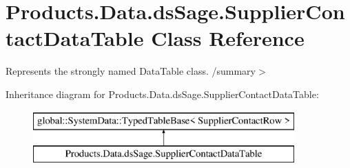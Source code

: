 \hypertarget{class_products_1_1_data_1_1ds_sage_1_1_supplier_contact_data_table}{}\section{Products.\+Data.\+ds\+Sage.\+Supplier\+Contact\+Data\+Table Class Reference}
\label{class_products_1_1_data_1_1ds_sage_1_1_supplier_contact_data_table}


Represents the strongly named Data\+Table class. /summary$>$  


Inheritance diagram for Products.\+Data.\+ds\+Sage.\+Supplier\+Contact\+Data\+Table\+:\begin{figure}[H]
\begin{center}
\leavevmode
\includegraphics[height=2.000000cm]{class_products_1_1_data_1_1ds_sage_1_1_supplier_contact_data_table}
\end{center}
\end{figure}
